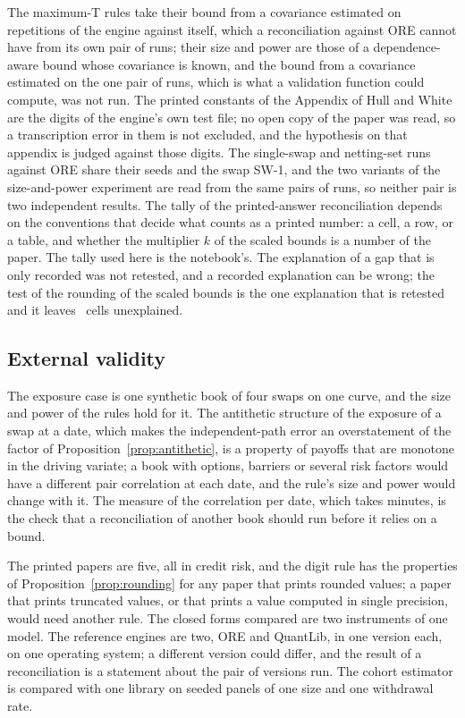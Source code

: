 The maximum-T rules take their bound from a covariance estimated on repetitions of the engine against itself, which a reconciliation against ORE cannot have from its own pair of runs; their size and power are those of a dependence-aware bound whose covariance is known, and the bound from a covariance estimated on the one pair of runs, which is what a validation function could compute, was not run. The printed constants of the Appendix of Hull and White are the digits of the engine's own test file; no open copy of the paper was read, so a transcription error in them is not excluded, and the hypothesis on that appendix is judged against those digits. The single-swap and netting-set runs against ORE share their seeds and the swap SW-1, and the two variants of the size-and-power experiment are read from the same pairs of runs, so neither pair is two independent results. The tally of the printed-answer reconciliation depends on the conventions that decide what counts as a printed number: a cell, a row, or a table, and whether the multiplier $k$ of the scaled bounds is a number of the paper. The tally used here is the notebook's. The explanation of a gap that is only recorded was not retested, and a recorded explanation can be wrong; the test of the rounding of the scaled bounds is the one explanation that is retested and it leaves \nScaledLeft\ cells unexplained.

\subsection{External validity}
\label{sec:limits-external}

The exposure case is one synthetic book of four swaps on one curve, and the size and power of the rules hold for it. The antithetic structure of the exposure of a swap at a date, which makes the independent-path error an overstatement of the factor of Proposition~\ref{prop:antithetic}, is a property of payoffs that are monotone in the driving variate; a book with options, barriers or several risk factors would have a different pair correlation at each date, and the rule's size and power would change with it. The measure of the correlation per date, which takes minutes, is the check that a reconciliation of another book should run before it relies on a bound.

The printed papers are five, all in credit risk, and the digit rule has the properties of Proposition~\ref{prop:rounding} for any paper that prints rounded values; a paper that prints truncated values, or that prints a value computed in single precision, would need another rule. The closed forms compared are two instruments of one model. The reference engines are two, ORE and QuantLib, in one version each, on one operating system; a different version could differ, and the result of a reconciliation is a statement about the pair of versions run. The cohort estimator is compared with one library on seeded panels of one size and one withdrawal rate.

